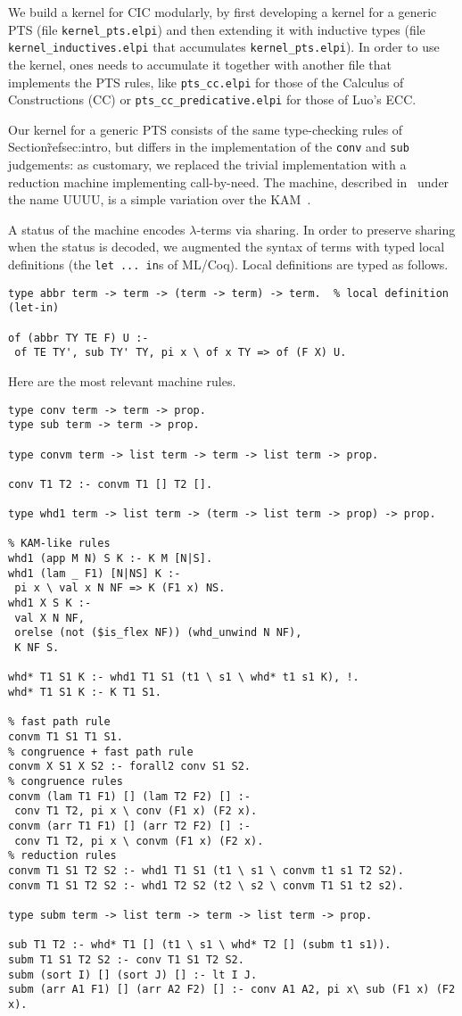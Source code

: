 We build a kernel for CIC modularly, by first developing a kernel for a generic PTS (file \verb+kernel_pts.elpi+) and then extending it with inductive types (file \verb+kernel_inductives.elpi+ that accumulates \verb+kernel_pts.elpi+). In order to use the kernel, ones needs to accumulate it together with another file that implements the PTS rules, like \verb+pts_cc.elpi+ for those of the Calculus of Constructions (CC) or \verb+pts_cc_predicative.elpi+ for those of Luo's ECC.

Our kernel for a generic PTS consists of the same type-checking rules of Section\~ref{sec:intro}, but differs in the implementation of the \verb+conv+ and \verb+sub+ judgements: as customary, we replaced the trivial implementation with a reduction machine implementing call-by-need. The machine, described in~\cite{beniamino} under the name UUUU, is a simple variation over the KAM~\cite{XXX}.

A status of the machine encodes $\lambda$-terms via sharing. In order to preserve sharing when the status is decoded, we augmented the syntax of terms with typed local definitions (the \verb+let ... in+s of ML/Coq). Local definitions are typed as follows.

\begin{verbatim}
type abbr term -> term -> (term -> term) -> term.  % local definition (let-in)

of (abbr TY TE F) U :-
 of TE TY', sub TY' TY, pi x \ of x TY => of (F X) U.
\end{verbatim}

Here are the most relevant machine rules.

\begin{verbatim}
type conv term -> term -> prop.
type sub term -> term -> prop.

type convm term -> list term -> term -> list term -> prop.

conv T1 T2 :- convm T1 [] T2 [].

type whd1 term -> list term -> (term -> list term -> prop) -> prop.

% KAM-like rules
whd1 (app M N) S K :- K M [N|S].
whd1 (lam _ F1) [N|NS] K :-
 pi x \ val x N NF => K (F1 x) NS.
whd1 X S K :-
 val X N NF,
 orelse (not ($is_flex NF)) (whd_unwind N NF),
 K NF S.

whd* T1 S1 K :- whd1 T1 S1 (t1 \ s1 \ whd* t1 s1 K), !.
whd* T1 S1 K :- K T1 S1.

% fast path rule
convm T1 S1 T1 S1.
% congruence + fast path rule
convm X S1 X S2 :- forall2 conv S1 S2.
% congruence rules
convm (lam T1 F1) [] (lam T2 F2) [] :-
 conv T1 T2, pi x \ conv (F1 x) (F2 x).
convm (arr T1 F1) [] (arr T2 F2) [] :-
 conv T1 T2, pi x \ convm (F1 x) (F2 x).
% reduction rules
convm T1 S1 T2 S2 :- whd1 T1 S1 (t1 \ s1 \ convm t1 s1 T2 S2).
convm T1 S1 T2 S2 :- whd1 T2 S2 (t2 \ s2 \ convm T1 S1 t2 s2).

type subm term -> list term -> term -> list term -> prop.

sub T1 T2 :- whd* T1 [] (t1 \ s1 \ whd* T2 [] (subm t1 s1)).
subm T1 S1 T2 S2 :- conv T1 S1 T2 S2.
subm (sort I) [] (sort J) [] :- lt I J.
subm (arr A1 F1) [] (arr A2 F2) [] :- conv A1 A2, pi x\ sub (F1 x) (F2 x).
\end{verbatim}


